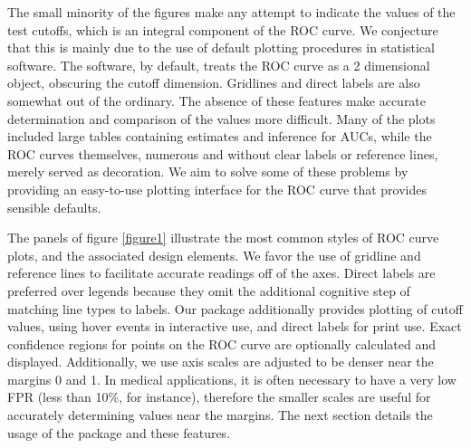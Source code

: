 \documentclass[article]{jss}
\begin{document}
The small minority of the figures make any attempt to indicate the
values of the test cutoffs, which is an integral component of the ROC
curve. We conjecture that this is mainly due to the use of default
plotting procedures in statistical software. The software, by default,
treats the ROC curve as a 2 dimensional object, obscuring the cutoff
dimension. Gridlines and direct labels are also somewhat out of the
ordinary. The absence of these features make accurate determination and
comparison of the values more difficult. Many of the plots included
large tables containing estimates and inference for AUCs, while the ROC
curves themselves, numerous and without clear labels or reference lines,
merely served as decoration. We aim to solve some of these problems by
providing an easy-to-use plotting interface for the ROC curve that
provides sensible defaults.

The panels of figure \ref{figure1} illustrate the most common styles of
ROC curve plots, and the associated design elements. We favor the use of
gridline and reference lines to facilitate accurate readings off of the
axes. Direct labels are preferred over legends because they omit the
additional cognitive step of matching line types to labels. Our
 package additionally provides plotting of cutoff values,
using hover events in interactive use, and direct labels for print use.
Exact confidence regions for points on the ROC curve are optionally
calculated and displayed. Additionally, we use axis scales are adjusted
to be denser near the margins 0 and 1. In medical applications, it is
often necessary to have a very low FPR (less than 10\%, for instance),
therefore the smaller scales are useful for accurately determining
values near the margins. The next section details the usage of the
  package and these features.
\end{document}
